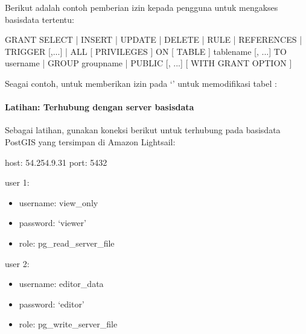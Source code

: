 \documentclass[letterpaper,10pt,english]{sphinxmanual}
\begin{document}

Berikut adalah contoh pemberian izin kepada pengguna untuk mengakses basisdata tertentu:

\begin{sphinxVerbatim}[commandchars=\\\{\}]
GRANT \PYGZob{} \PYGZob{} SELECT | INSERT | UPDATE | DELETE | RULE | REFERENCES | TRIGGER \PYGZcb{}
    [,...] | ALL [ PRIVILEGES ] \PYGZcb{}
    ON [ TABLE ] tablename [, ...]
    TO \PYGZob{} username | GROUP groupname | PUBLIC \PYGZcb{} [, ...] [ WITH GRANT OPTION ]
\end{sphinxVerbatim}

Seagai contoh, untuk memberikan izin pada ‘’ untuk memodifikasi tabel :

\begin{sphinxVerbatim}[commandchars=\\\{\}]
        
\end{sphinxVerbatim}


\paragraph{Latihan: Terhubung dengan server basisdata}
\label{\detokenize{sesi2/dbmanagement:latihan-terhubung-dengan-server-basisdata}}
Sebagai latihan, gunakan koneksi berikut untuk terhubung pada basisdata PostGIS yang tersimpan di Amazon Lightsail:

host: 54.254.9.31
port: 5432

user 1:
\begin{itemize}
\item {} 
username: view\_only

\item {} 
password: ‘viewer’

\item {} 
role: pg\_read\_server\_file

\end{itemize}

user 2:
\begin{itemize}
\item {} 
username: editor\_data

\item {} 
password: ‘editor’

\item {} 
role: pg\_write\_server\_file

\end{itemize}
\end{document}
